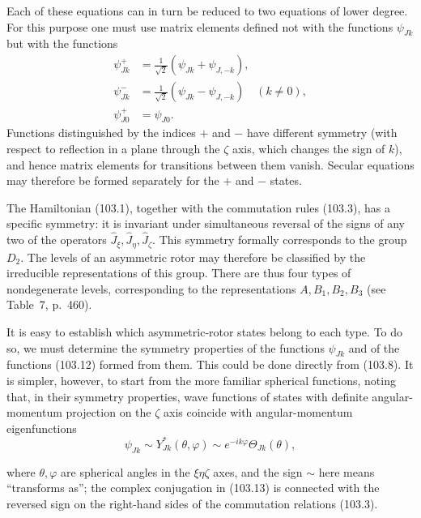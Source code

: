 Each of these equations can in turn be reduced to two equations of lower degree. For this purpose one must use matrix elements defined not with the functions $\psi_{Jk}$ but with the functions
\begin{equation}
 \begin{aligned}
 \psi_{Jk}^{+}&=\frac1{\sqrt2}(\psi_{Jk}+\psi_{J,-k}),\\
 \psi_{Jk}^{-}&=\frac1{\sqrt2}(\psi_{Jk}-\psi_{J,-k})\quad(k\ne0),\\
 \psi_{J0}^{+}&=\psi_{J0}.
 \end{aligned} \tag{103.12}
\end{equation}
Functions distinguished by the indices $+$ and $-$ have different symmetry (with respect to reflection in a plane through the $\zeta$ axis, which changes the sign of $k$), and hence matrix elements for transitions between them vanish. Secular equations may therefore be formed separately for the $+$ and $-$ states.

The Hamiltonian (103.1), together with the commutation rules (103.3), has a specific symmetry: it is invariant under simultaneous reversal of the signs of any two of the operators $\hat J_\xi,\hat J_\eta,\hat J_\zeta$. This symmetry formally corresponds to the group $D_2$. The levels of an asymmetric rotor may therefore be classified by the irreducible representations of this group. There are thus four types of nondegenerate levels, corresponding to the representations $A,B_1,B_2,B_3$ (see Table~7, p.~460).

It is easy to establish which asymmetric-rotor states belong to each type. To do so, we must determine the symmetry properties of the functions $\psi_{Jk}$ and of the functions (103.12) formed from them. This could be done directly from (103.8). It is simpler, however, to start from the more familiar spherical functions, noting that, in their symmetry properties, wave functions of states with definite angular-momentum projection on the $\zeta$ axis coincide with angular-momentum eigenfunctions
\begin{equation}
 \psi_{Jk}\sim Y_{Jk}^*(\theta,\varphi)\sim e^{-ik\varphi}\Theta_{Jk}(\theta), \tag{103.13}
\end{equation}

where $\theta,\varphi$ are spherical angles in the $\xi\eta\zeta$ axes, and the sign $\sim$ here means ``transforms as''; the complex conjugation in (103.13) is connected with the reversed sign on the right-hand sides of the commutation relations (103.3).

